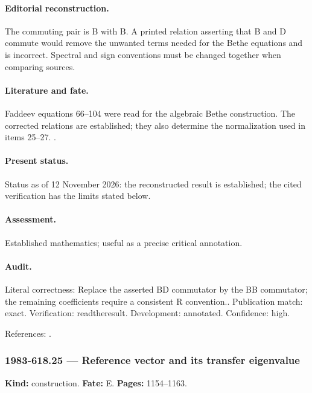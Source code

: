 \paragraph{Editorial reconstruction.} The commuting pair is B with B. A printed relation asserting that B and D commute would remove the unwanted terms needed for the Bethe equations and is incorrect. Spectral and sign conventions must be changed together when comparing sources.

\paragraph{Literature and fate.} Faddeev equations 66--104 were read for the algebraic Bethe construction. The corrected relations are established; they also determine the normalization used in items 25--27. \citep{faddeev1996bethe}.

\paragraph{Present status.} Status as of 12 November 2026: the reconstructed result is established; the cited verification has the limits stated below.

\paragraph{Assessment.} Established mathematics; useful as a precise critical annotation.

\paragraph{Audit.} Literal correctness: Replace the asserted BD commutator by the BB commutator; the remaining coefficients require a consistent R convention.. Publication match: exact. Verification: readtheresult. Development: annotated. Confidence: high.

\noindent References: \citep{faddeev1996bethe}.\par

\subsubsection{1983-618.25 --- Reference vector and its transfer eigenvalue}

\label{item:1983-618.25}

\noindent\textbf{Kind:} construction. \textbf{Fate:} E. \textbf{Pages:} 1154--1163.\par

